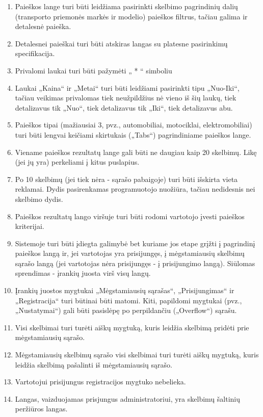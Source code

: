 \documentclass[12pt]{article}
\begin{document}
\begin{enumerate}[labelindent=10pt,leftmargin=2.2cm]
		\item Paieškos lange turi būti leidžiama pasirinkti skelbimo pagrindinių dalių (transporto priemonės markės ir modelio) paieškos filtrus, tačiau galima ir detalesnė paieška.
		\item Detalesnei paieškai turi būti atskiras langas su platesne pasirinkimų specifikacija.
		\item Privalomi laukai turi būti pažymėti „ * “ simboliu
		\item Laukai „Kaina“ ir „Metai“ turi būti leidžiami pasirinkti tipu „Nuo-Iki“, tačiau veikimas privalomas tiek neužpildžius nė vieno iš šių laukų, tiek detalizavus tik „Nuo“, tiek detalizavus tik „Iki“, tiek detalizavus abu.
		\item Paieškos tipai (mažiausiai 3, pvz., automobiliai, motociklai, elektromobiliai) turi būti lengvai keičiami skirtukais („Tabs“) pagrindiniame paieškos lange.
		\item Viename paieškos rezultatų lange gali būti ne daugiau kaip 20 skelbimų. Likę (jei jų yra) perkeliami į kitus puslapius.
		\item Po 10 skelbimų (jei tiek nėra - sąrašo pabaigoje) turi būti išskirta vieta reklamai. Dydis pasirenkamas programuotojo nuožiūra, tačiau nedidesnis nei skelbimo dydis.
		\item Paieškos rezultatų lango viršuje turi būti rodomi vartotojo įvesti paieškos kriterijai.
		\item Sistemoje turi būti įdiegta galimybė bet kuriame jos etape grįžti į pagrindinį paieškos langą ir, jei vartotojas yra prisijungęs, į mėgstamiausių skelbimų sąrašo langą (jei vartotojas nėra prisijungęs - į prisijungimo langą). Siūlomas sprendimas - įrankių juosta virš visų langų.
		\item Įrankių juostos mygtukai „Mėgstamiausių sąrašas“, „Prisijungimas“ ir „Registracija“ turi būtinai būti matomi. Kiti, papildomi mygtukai (pvz., „Nustatymai“) gali būti pasislėpę po perpildančiu („Overflow“) sąrašu.
		\item Visi skelbimai turi turėti aiškų mygtuką, kuris leidžia skelbimą pridėti prie mėgstamiausių sąrašo.
		\item Mėgstamiausių skelbimų sąrašo visi skelbimai turi turėti aiškų mygtuką, kuris leidžia skelbimą pašalinti iš mėgstamiausių sąrašo.
		\item Vartotojui prisijungus registracijos mygtuko nebelieka.
		\item Langas, vaizduojamas prisjungus administratoriui, yra skelbimų šaltinių peržiūros langas. 
	\end{enumerate}
		
\end{document}
